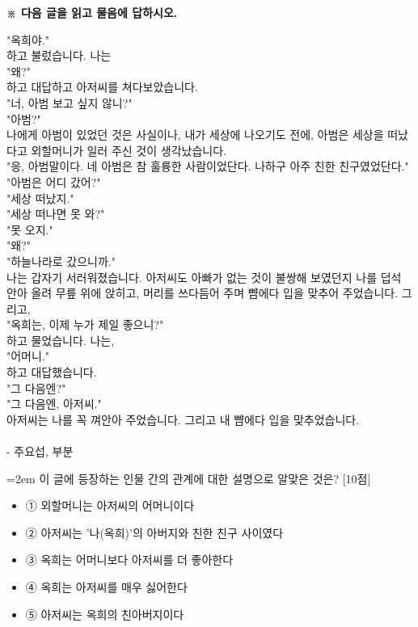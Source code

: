 \documentclass[12pt,a4paper]{article}
\newcommand{\qnum}[1]{%
  \tikz[baseline=(num.base)]{%
    \node[circle, fill=numCircle, text=white, inner sep=0pt,
          minimum size=18pt, font=\small\bfseries] (num) {#1};%
  }%
}
\newcommand{\pts}[1]{%
  \hfill\textcolor{ptsBadge}{[#1점]}%
}
\begin{document}
\vspace{4mm}
{\small\textbf{※ 다음 글을 읽고 물음에 답하시오.}}
\vspace{2mm}
\begin{tcolorbox}[passage]
"옥희야." \\{}
하고 불렀습니다. 나는 \\{}
"왜?" \\{}
하고 대답하고 아저씨를 쳐다보았습니다. \\{}
"너, 아범 보고 싶지 않니?" \\{}
"아범?" \\{}
나에게 아범이 있었던 것은 사실이나, 내가 세상에 나오기도 전에, 아범은 세상을 떠났다고 외할머니가 일러 주신 것이 생각났습니다. \\{}
"응, 아범말이다. 네 아범은 참 훌륭한 사람이었단다. 나하구 아주 친한 친구였었단다." \\{}
"아범은 어디 갔어?" \\{}
"세상 떠났지." \\{}
"세상 떠나면 못 와?" \\{}
"못 오지." \\{}
"왜?" \\{}
"하늘나라로 갔으니까." \\{}
나는 갑자기 서러워졌습니다. 아저씨도 아빠가 없는 것이 불쌍해 보였던지 나를 덥석 안아 올려 무릎 위에 앉히고, 머리를 쓰다듬어 주며 뺨에다 입을 맞추어 주었습니다. 그리고, \\{}
"옥희는, 이제 누가 제일 좋으니?" \\{}
하고 물었습니다. 나는, \\{}
"어머니." \\{}
하고 대답했습니다. \\{}
"그 다음엔?" \\{}
"그 다음엔, 아저씨." \\{}
아저씨는 나를 꼭 껴안아 주었습니다. 그리고 내 뺨에다 입을 맞추었습니다. \\{}
\vspace{4pt} \\{}
- 주요섭,  부분
\end{tcolorbox}
\vspace{3mm}
\begin{minipage}{\columnwidth}
{\hangindent=2em
\qnum{33}\enspace 이 글에 등장하는 인물 간의 관계에 대한 설명으로 알맞은 것은? \pts{10}
\par}

\vspace{3mm}
\begin{itemize}[leftmargin=2.5em, labelsep=0.3em, label={}, itemsep=4pt, parsep=1pt, topsep=0pt]
  \item ① 외할머니는 아저씨의 어머니이다
  \item ② 아저씨는 '나(옥희)'의 아버지와 친한 친구 사이였다
  \item ③ 옥희는 어머니보다 아저씨를 더 좋아한다
  \item ④ 옥희는 아저씨를 매우 싫어한다
  \item ⑤ 아저씨는 옥희의 친아버지이다
\end{itemize}
\end{minipage}
\vspace{4mm}
\end{document}
